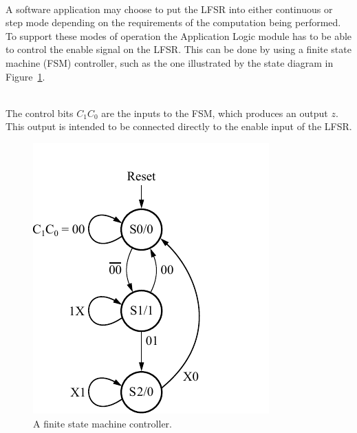 \documentclass[epsfig,10pt,fullpage]{article}
\begin{document}
~\\
\noindent
A software application may choose to put the LFSR into either continuous or step mode
depending on the requirements of the computation being performed. To support these modes
of operation the Application Logic module has to be able to control the enable signal 
on the LFSR. This can be done by using a finite state machine (FSM) controller, 
such as the one illustrated by the state diagram in Figure~\ref{fig:fsm}.

~\\
\noindent
The control bits $C_1 C_0$ are the inputs to the FSM, which produces an output $z$. This
output is intended to be connected directly to the enable input of the LFSR. 
\clearpage
\begin{figure}[hb]
   \begin{center}
       \includegraphics[scale=1.0]{figures/fsm.pdf}
   \end{center}
   \caption{A finite state machine controller.}
	\label{fig:fsm}
\end{figure}
\end{document}
